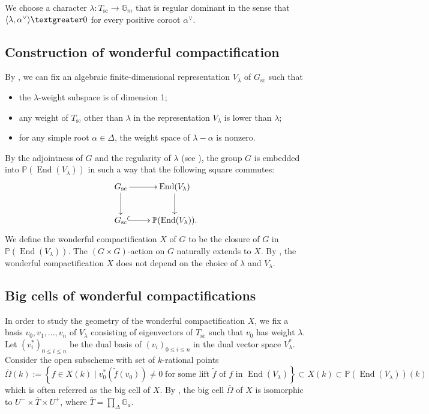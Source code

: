 \documentclass[11pt, reqno]{amsart}
\theoremstyle{plain}
\theoremstyle{definition}
\DeclareMathOperator{\End}{End} %
\begin{document}
We choose a character $\lambda\colon T_{\text{sc}}\rightarrow \mathbb{G}_m$ that is regular dominant in the sense that $\langle\lambda,\alpha^\vee\rangle\textgreater 0$ for every positive coroot $\alpha^\vee$.










\subsection{Construction of wonderful compactification}\label{reviewofwonderful}
By \cite[Lemma~6.1.1 and Remark~6.1.2]{BrionKumar}, we can fix an algebraic finite-dimensional representation $V_{\lambda}$ of $G_{\text{sc}}$ such that 
\begin{itemize}
    \item the $\lambda$-weight subspace is of dimension 1;
    \item any weight of $T_{\text{sc}}$ other than $\lambda$ in the representation $V_{\lambda}$ is lower than $\lambda$;
    \item for any simple root $\alpha\in\Delta$, the weight space of $\lambda-\alpha$ is nonzero.
\end{itemize}
By the adjointness of $G$ and the regularity of $\lambda$ (see \cite[Lemma~6.1.3]{BrionKumar}), the group $G$ is embedded into  $\mathbb{P}(\End(V_{\lambda}))$ in such a way that the following square commutes:
$$\xymatrix{
G_{\text{sc}} \ar[d] \ar[r]
&\End(V_{\lambda})\ar[d]\\
G_{\text{sc}} \ar@{^{(}->}[r]         &\mathbb{P}(\End(V_{\lambda})).}$$
We define the wonderful compactification $X$ of $G$ to be the closure of $G$ in $\mathbb{P}(\End(V_{\lambda}))$. The $(G\times G)$-action on $G$ naturally extends to $X$. By \cite[Theorem~6.1.8 (iv)]{BrionKumar}, the wonderful compactification $X$ does not depend on the choice of $\lambda$ and $V_{\lambda}$.

\subsection{Big cells of wonderful compactifications}\label{lift}
In order to study the geometry of the wonderful compactification $X$, we fix a basis $v_0, v_1,..., v_n$ of $V_{\lambda}$ consisting of eigenvectors of $T_{\text{sc}}$ such that $v_0$ has weight $\lambda$. Let $(v_i^*)_{0\leq i\leq n}$ be the dual basis of $(v_i)_{0\leq i\leq n}$ in the dual vector space $V_{\lambda}^*$. Consider the open subscheme with set of $k$-rational points 
\begin{equation*}\label{equationofbigcell}
\overline{\Omega}(k):=\left\{f\in X(k)\;\vert\; v_0^*(\widetilde{f}(v_0))\neq 0  \;\text{for some lift $\widetilde{f}$ of $f$ in $\End(V_{\lambda})$}\right\}\subset X(k)\subset \mathbb{P}(\End(V_{\lambda}))(k)
\end{equation*}
which is often referred as the big cell of $X$. By \cite[Proposition~6.1.7]{BrionKumar}, the big cell $\overline{\Omega}$ of $X$ is isomorphic to $U^-\times \overline{T}\times U^+$, where $\overline{T}=\prod_{\Delta}\mathbb{G}_a$. 
\end{document}
